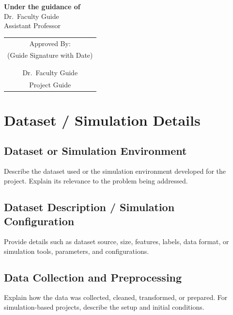 \documentclass[12pt,a4paper]{report}
\begin{document}
\begin{titlepage}
\begin{center}
\vfill

{\large \textbf{Under the guidance of}}\\[0.2cm]
{\large Dr.\ Faculty Guide}\\
Assistant Professor\\
\vspace{0.6cm}
\begin{tabular}{c}
Approved By: \\
(Guide Signature with Date) \\
 \\
\shortstack{\rule{4cm}{0.4pt}\\
Dr.\ Faculty Guide\\
Project Guide}
\end{tabular}

\vfill



\end{center}
\end{titlepage}


\setcounter{chapter}{2}


\chapter{Dataset / Simulation Details}
\section{Dataset or Simulation Environment}
Describe the dataset used or the simulation environment developed
for the project. Explain its relevance to the problem being addressed.

\section{Dataset Description / Simulation Configuration}
Provide details such as dataset source, size, features, labels,
data format, or simulation tools, parameters, and configurations.

\section{Data Collection and Preprocessing}
Explain how the data was collected, cleaned, transformed, or prepared.
For simulation-based projects, describe the setup and initial conditions.
\end{document}
